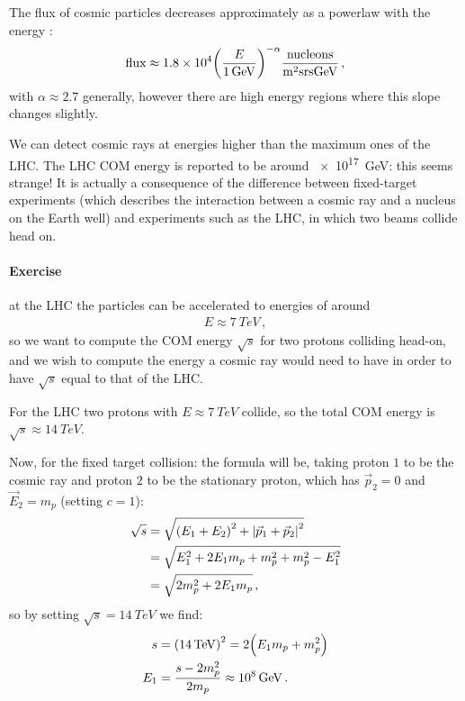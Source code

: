 \documentclass[main.tex]{subfiles}
\begin{document}
The flux of cosmic particles decreases approximately as a powerlaw with the energy \cite[eq. 30.2]{patrignaniCosmicRays}: 
%
\begin{align}
\text{flux} \approx \num{1.8e4} \qty(\frac{E}{\SI{1}{GeV}})^{-\alpha }  \frac{\text{nucleons}}{\SI{}{m^2 sr s GeV}}
\,,
\end{align}
%
with \(\alpha \approx \num{2.7}\) generally, however there are high energy regions where this slope changes slightly.

We can detect cosmic rays at energies higher than the maximum ones of the LHC. 
The LHC COM energy is reported to be around \SI{e17}{GeV}: this seems strange!
It is actually a consequence of the difference between fixed-target experiments (which describes the interaction between a cosmic ray and a nucleus on the Earth well) and experiments such as the LHC, in which two beams collide head on.

\paragraph{Exercise} at the LHC the particles can be accelerated to energies of around
%
\begin{align}
E \approx \SI{7}{TeV}
\,,
\end{align}
%
so we want to compute the COM energy \(\sqrt{s}\) for two protons colliding head-on, and we wish to compute the energy a cosmic ray would need to have in order to have \(\sqrt{s}\) equal to that of the LHC. 

For the LHC two protons with \(E \approx \SI{7}{TeV}\) collide, so the total COM energy is \(\sqrt{s} \approx \SI{14}{TeV}\). 

Now, for the fixed target collision: the formula will be, taking proton \(1 \) to be the cosmic ray and proton \(2\) to be the stationary proton, which has \(\vec{p}_{2} = 0\) and \(\vec{E}_{2}  = m_p\) (setting \(c=1\)):  
%
\begin{subequations}
\begin{align}
\sqrt{s} &= \sqrt{\qty(E_1 + E_2 )^2 + \abs{\vec{p}_1 + \vec{p}_2}^2 }  \\
&= \sqrt{E_1^2 + 2 E_1 m_p + m_p^2 + m_p^2 - E_1^2}  \\
&= \sqrt{2 m_p^2 + 2 E_1 m_p} 
\,,
\end{align}
\end{subequations}
%
so by setting \(\sqrt{s} = \SI{14}{TeV}\) we find: 
%
\begin{subequations}
\begin{align}
s &=  \qty(\SI{14}{TeV})^2= 2 \qty(E_1 m_p + m_p^2)  \\
E_1 &= \frac{s - 2 m_p^2}{2 m_p} \approx \SI{e8}{GeV}
\,.
\end{align}
\end{subequations}
\end{document}
